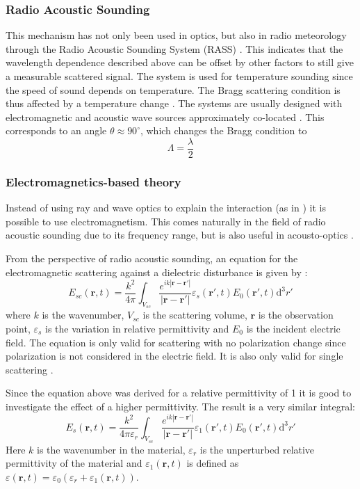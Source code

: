 \documentclass[10pt,a4paper,twocolumn,draft]{scrartcl}
\begin{document}
	\subsubsection{Radio Acoustic Sounding}
	This mechanism has not only been used in optics, but also in radio meteorology through the Radio Acoustic Sounding System (RASS) \cite{Buerkle2007}. This indicates that the wavelength dependence described above can be offset by other factors to still give a measurable scattered signal. The system is used for temperature sounding since the speed of sound depends on temperature. The Bragg scattering condition is thus affected by a temperature change \cite{Marshall1972}. The systems are usually designed with electromagnetic and acoustic wave sources approximately co-located \cite{Marshall1972}. This corresponds to an angle $\theta \approx 90^\circ$, which changes the Bragg condition to
	\begin{equation*}
		\Lambda = \frac{\lambda}{2}
	\end{equation*}
	
	\subsubsection{Electromagnetics-based theory}
	Instead of using ray and wave optics to explain the interaction (as in \cite{Saleh2007}) it is possible to use electromagnetism. This comes naturally in the field of radio acoustic sounding due to its frequency range, but is also useful in acousto-optics \cite{Korpel1988}. 
	
	From the perspective of radio acoustic sounding, an equation for the electromagnetic scattering against a dielectric disturbance is given by \cite{Gurvich1987}:
	\begin{equation*}
		E_{sc}(\bm{r},t) = \frac{k^2}{4\pi} \int_{V_{sc}} \frac{e^{ik \left| \bm{r}-\bm{r'} \right| }}{ \left| \bm{r}-\bm{r'} \right| } \varepsilon_s (\bm{r'},t) E_0 (\bm{r'},t) \mathrm{d}^3r'
	\end{equation*}
	where $k$ is the wavenumber, $V_{sc}$ is the scattering volume, $\bm{r}$ is the observation point, $\varepsilon_s$ is the variation in relative permittivity and $E_0$ is the incident electric field. The equation is only valid for scattering with no polarization change since polarization is not considered in the electric field. It is also only valid for single scattering \cite{Gurvich1987}.
	
	Since the equation above was derived for a relative permittivity of 1 it is good to investigate the effect of a higher permittivity. The result is a very similar integral: 
	\begin{equation*}
	E_{s}(\bm{r},t) = \frac{k^2}{4\pi\varepsilon_r} \int_{V_{sc}} \frac{e^{ik \left| \bm{r}-\bm{r'} \right| }}{ \left| \bm{r}-\bm{r'} \right| } \varepsilon_1 (\bm{r'},t) E_0 (\bm{r'},t) \mathrm{d}^3r'
	\end{equation*}
	Here $k$ is the wavenumber in the material, $\varepsilon_r$ is the unperturbed relative permittivity of the material and $\varepsilon_1 (\bm{r},t)$ is defined as $\varepsilon (\bm{r},t) = \varepsilon_0 (\varepsilon_r + \varepsilon_1 (\bm{r},t))$.
	
\end{document}
